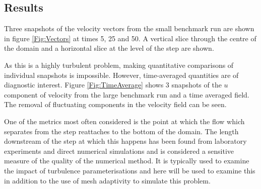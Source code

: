 \subsection{Results}
Three snapshots of the velocity vectors from the small benchmark run
are shown in figure \ref{Fig:Vectors} at times
5, 25 and 50. A vertical slice through the centre of the domain and a horizontal slice
at the level of the step are shown.




As this is a highly turbulent problem, making quantitative comparisons of
individual snapshots is impossible. However, time-averaged quantities are of diagnostic interest.
Figure \ref{Fig:TimeAverage} shows 3 snapshots of the $u$ component of velocity from the large
benchmark run and a time
averaged field. The removal of fluctuating components in the velocity field can be seen.




One of the metrics most often considered is the point at which the flow which separates from the step
reattaches to the bottom of the domain. The length downstream of the step at which this happens
has been found from laboratory experiments and direct numerical simulations and is considered a
sensitive measure of the quality of the numerical method. It is typically used to examine the impact
of turbulence parameterisations and here will be used to examine this in addition to the use of mesh
adaptivity to simulate this problem.

